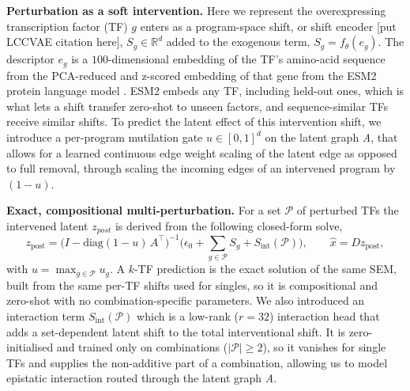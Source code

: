 \documentclass{article}
\begin{document}
\textbf{Perturbation as a soft intervention.} Here we represent the overexpressing transcription factor (TF) $g$ enters as a
program-space shift, or shift encoder [put LCCVAE citation here],  $S_g\in\mathbb{R}^{d}$ added to the exogenous term, $S_g=f_\theta(e_g)$. The
descriptor $e_g$ is a $100$-dimensional embedding of the TF's amino-acid sequence from the PCA-reduced and z-scored embedding of that gene from the ESM2 protein
language model \citep{lin2023esm2}. ESM2 embeds any TF, including held-out
ones, which is what lets a shift transfer zero-shot to unseen factors, and sequence-similar TFs receive
similar shifts. To predict the latent effect of this intervention shift, we introduce a per-program mutilation gate $u\in[0,1]^{d}$ on the latent graph \emph{A}, that allows for a learned continuous edge weight scaling of the latent edge as opposed to full removal, through scaling the
incoming edges of an intervened program by $(1-u)$.

\textbf{Exact, compositional multi-perturbation.} For a set $\mathcal{P}$ of perturbed TFs the intervened
latent $z_{post}$ is derived from the following closed-form solve,
\begin{equation}
z_{\mathrm{post}} = \big(I-\mathrm{diag}(1-u)\,A^\top\big)^{-1}
\Big(\epsilon_0 + \textstyle\sum_{g\in\mathcal{P}} S_g + S_{\mathrm{int}}(\mathcal{P})\Big),
\qquad \hat{x}=Dz_{\mathrm{post}},
\label{eq:doop}
\end{equation}
with $u=\max_{g\in\mathcal{P}}u_g$. A $k$-TF prediction is the exact solution of the same SEM, built from
the same per-TF shifts used for singles, so it is compositional and zero-shot with no
combination-specific parameters. We also introduced an interaction term $S_{\mathrm{int}}(\mathcal{P})$ which is a low-rank ($r{=}32$)
interaction head that adds a set-dependent latent shift to the total interventional shift. It is zero-initialised and trained only on
combinations ($|\mathcal{P}|\ge 2$), so it vanishes for single TFs and supplies the non-additive part of
a combination, allowing us to model epistatic interaction routed through the latent graph \emph{A}.
\end{document}
